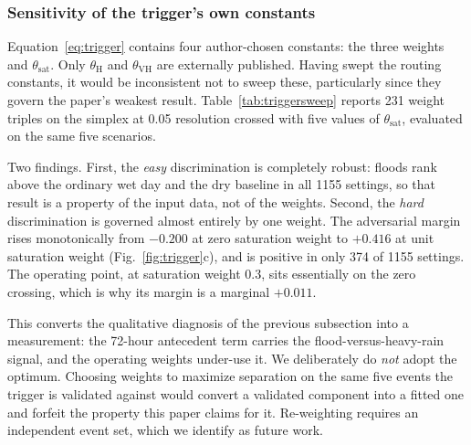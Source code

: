 \documentclass[10pt,twocolumn]{article}
\begin{document}
\subsubsection*{Sensitivity of the trigger's own constants}
\label{sec:res-trigger-sweep}
Equation~\eqref{eq:trigger} contains four author-chosen constants: the three
weights and $\theta_{\mathrm{sat}}$. Only $\theta_{\mathrm{H}}$ and
$\theta_{\mathrm{VH}}$ are externally published. Having swept the routing
constants, it would be inconsistent not to sweep these, particularly since they
govern the paper's weakest result. Table~\ref{tab:triggersweep} reports 231
weight triples on the simplex at 0.05 resolution crossed with five values of
$\theta_{\mathrm{sat}}$, evaluated on the same five scenarios.

Two findings. First, the \emph{easy} discrimination is completely robust: floods
rank above the ordinary wet day and the dry baseline in all \num{1155} settings,
so that result is a property of the input data, not of the weights.
Second, the \emph{hard} discrimination is governed almost entirely by one weight.
The adversarial margin rises monotonically from $-0.200$ at zero saturation
weight to $+0.416$ at unit saturation weight
(Fig.~\ref{fig:trigger}c), and is positive in only 374 of \num{1155} settings.
The operating point, at saturation weight 0.3, sits essentially on the zero
crossing, which is why its margin is a marginal $+0.011$.

This converts the qualitative diagnosis of the previous subsection into a
measurement: the 72-hour antecedent term carries the flood-versus-heavy-rain
signal, and the operating weights under-use it. We deliberately do \emph{not}
adopt the optimum. Choosing weights to maximize separation on the same five
events the trigger is validated against would convert a validated component into
a fitted one and forfeit the property this paper claims for it. Re-weighting
requires an independent event set, which we identify as future work.
\end{document}
